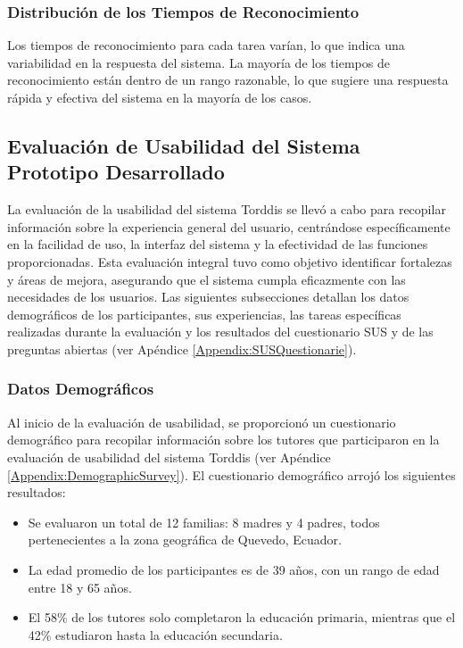 \documentclass[a4paper,fleqn]{cas-sc}
\begin{document}
	\subsubsection{Distribución de los Tiempos de Reconocimiento}
	Los tiempos de reconocimiento para cada tarea varían, lo que indica una variabilidad en la respuesta del sistema. La mayoría de los tiempos de reconocimiento están dentro de un rango razonable, lo que sugiere una respuesta rápida y efectiva del sistema en la mayoría de los casos.
	
	\subsection{Evaluación de Usabilidad del Sistema Prototipo Desarrollado}
	La evaluación de la usabilidad del sistema Torddis se llevó a cabo para recopilar información sobre la experiencia general del usuario, centrándose específicamente en la facilidad de uso, la interfaz del sistema y la efectividad de las funciones proporcionadas. Esta evaluación integral tuvo como objetivo identificar fortalezas y áreas de mejora, asegurando que el sistema cumpla eficazmente con las necesidades de los usuarios. Las siguientes subsecciones detallan los datos demográficos de los participantes, sus experiencias, las tareas específicas realizadas durante la evaluación y los resultados del cuestionario SUS y de las preguntas abiertas (ver Apéndice \ref{Appendix:SUSQuestionarie}).
	
	\subsubsection{Datos Demográficos}
	Al inicio de la evaluación de usabilidad, se proporcionó un cuestionario demográfico para recopilar información sobre los tutores que participaron en la evaluación de usabilidad del sistema Torddis (ver Apéndice \ref{Appendix:DemographicSurvey}). El cuestionario demográfico arrojó los siguientes resultados:
	
	\begin{itemize}
		\item Se evaluaron un total de 12 familias: 8 madres y 4 padres, todos pertenecientes a la zona geográfica de Quevedo, Ecuador.
		\item La edad promedio de los participantes es de 39 años, con un rango de edad entre 18 y 65 años.
		\item El 58\% de los tutores solo completaron la educación primaria, mientras que el 42\% estudiaron hasta la educación secundaria.
	\end{itemize}
	
\end{document}
